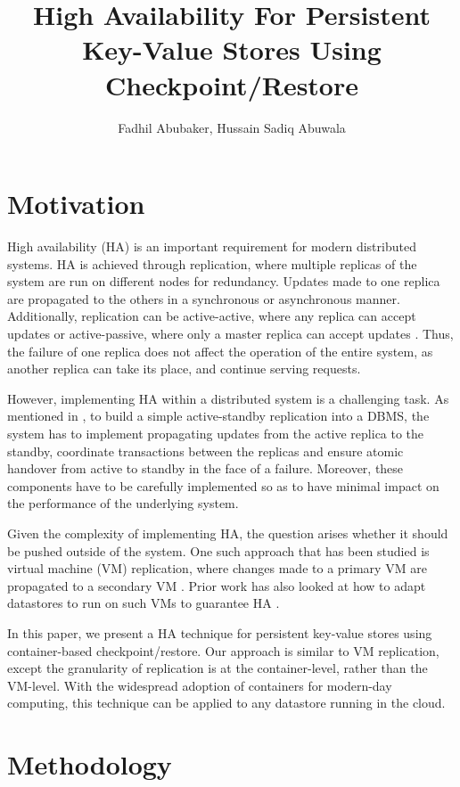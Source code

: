 \documentclass{proc}
\title{High Availability For Persistent Key-Value Stores Using Checkpoint/Restore}
\author{Fadhil Abubaker, Hussain Sadiq Abuwala}
\date{}
\begin{document}
\maketitle

\section{Motivation}

High availability (HA) is an important requirement for modern distributed
systems. HA is achieved through replication, where multiple replicas of the
system are run on different nodes for redundancy. Updates made to one replica
are propagated to the others in a synchronous or asynchronous manner.
Additionally, replication can be active-active, where any replica can accept
updates or active-passive, where only a master replica can accept updates
\cite{Dangers}. Thus, the failure of one replica does not affect the operation
of the entire system, as another replica can take its place, and continue
serving requests.

However, implementing HA within a distributed system is a challenging task. As
mentioned in \cite{RemusDB}, to build a simple active-standby replication into a
DBMS, the system has to implement propagating updates from the active replica to
the standby, coordinate transactions between the replicas and ensure atomic
handover from active to standby in the face of a failure. Moreover, these
components have to be carefully implemented so as to have minimal impact on the
performance of the underlying system.

Given the complexity of implementing HA, the question arises whether it should
be pushed outside of the system. One such approach that has been studied is
virtual machine (VM) replication, where changes made to a primary VM are
propagated to a secondary VM \cite{Hypervisor, Remus, Scales2010TheDA}. Prior
work has also looked at how to adapt datastores to run on such VMs to guarantee
HA \cite{RemusDB}.

In this paper, we present a HA technique for persistent key-value stores using
container-based checkpoint/restore. Our approach is similar to VM replication,
except the granularity of replication is at the container-level, rather than the
VM-level. With the widespread adoption of containers for modern-day computing,
this technique can be applied to any datastore running in the cloud.

\section{Methodology}
\end{document}
